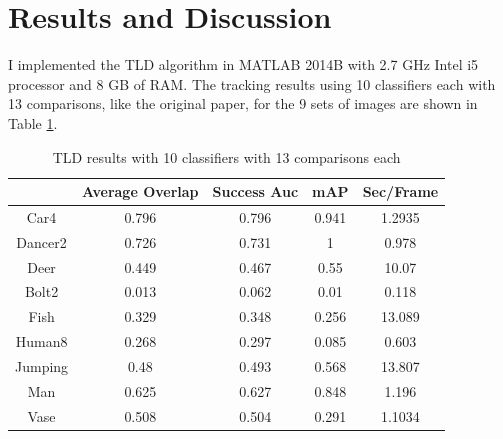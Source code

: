 \documentclass[10pt,twocolumn,letterpaper]{article}
\begin{document}
\section{Results and Discussion}
I implemented the TLD algorithm in MATLAB 2014B with 2.7 GHz Intel i5 processor and 8 GB of RAM. The tracking results using 10 classifiers each with 13 comparisons, like the original paper, for the 9 sets of images are shown in Table \ref{table:results1}.
\begin{table}
\begin{center}
\begin{tabular} {|c|c|c|c|c|}
\hline
&Average Overlap& Success Auc & mAP &Sec/Frame \\ \hline
Car4 & 0.796 & 0.796 & 0.941 & 1.2935 \\ 
Dancer2 & 0.726 & 0.731 & 1 & 0.978 \\ 
Deer & 0.449 & 0.467 & 0.55 & 10.07 \\
Bolt2 & 0.013 & 0.062& 0.01 & 0.118 \\
Fish & 0.329 & 0.348 & 0.256 & 13.089 \\
Human8 & 0.268 & 0.297 & 0.085 & 0.603 \\
Jumping & 0.48 & 0.493 & 0.568 & 13.807 \\
Man & 0.625 & 0.627 & 0.848 & 1.196 \\
Vase & 0.508 & 0.504 & 0.291 & 1.1034 \\\hline
\end{tabular}
\caption{TLD results with 10 classifiers with 13 comparisons each}
\label{table:results1}
\end{center}
\end{table}
\end{document}
